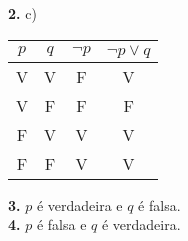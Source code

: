 \documentclass[a4paper,twocolumn,12pt]{article}
\begin{document}
{  \begin{minipage}{0.49\columnwidth}
    \textbf{2.} c)
    
    \begin{tabular}{|c|c|c|c|}
      \hline
      $p$ & $q$ & $\neg p$ & $\neg p \lor q$ \\
      \hline
      V & V & F & V \\
      V & F & F & F \\
      F & V & V & V \\
      F & F & V & V \\
      \hline
      \end{tabular}
    
  \end{minipage}\begin{minipage}{0.49\columnwidth}

  \textbf{3.} $p$ é verdadeira e $q$ é falsa.\\
  \textbf{4.} $p$ é falsa e $q$ é verdadeira.
\end{minipage}
}
\end{document}
